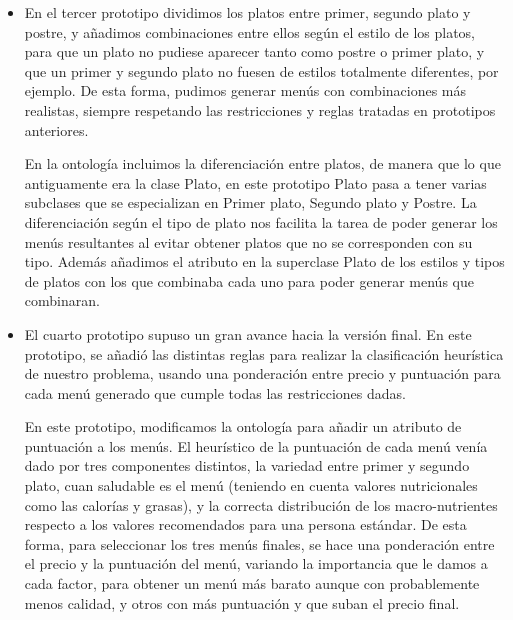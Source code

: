 \documentclass{article}
\begin{document}
\begin{itemize}
    \item En el tercer prototipo dividimos los platos entre primer, segundo plato y postre, y añadimos combinaciones entre ellos según el estilo de los platos, para que un plato no pudiese aparecer tanto como postre o primer plato, y que un primer y segundo plato no fuesen de estilos totalmente diferentes, por ejemplo. De esta forma, pudimos generar menús con combinaciones más realistas, siempre respetando las restricciones y reglas tratadas en prototipos anteriores.
    \par
    En la ontología incluimos la diferenciación entre platos, de manera que lo que antiguamente era la clase Plato, en este prototipo Plato pasa a tener varias subclases que se especializan en Primer plato, Segundo plato y Postre. La diferenciación según el tipo de plato nos facilita la tarea de poder generar los menús resultantes al evitar obtener platos que no se corresponden con su tipo. Además añadimos el atributo en la superclase Plato de los estilos y tipos de platos con los que combinaba cada uno para poder generar menús que combinaran.

    \item El cuarto prototipo supuso un gran avance hacia la versión final. En este prototipo, se añadió las distintas reglas para realizar la clasificación heurística de nuestro problema, usando una ponderación entre precio y puntuación para cada menú generado que cumple todas las restricciones dadas.
    \par
    En este prototipo, modificamos la ontología para añadir un atributo de puntuación a los menús. El heurístico de la puntuación de cada menú venía dado por tres componentes distintos, la variedad entre primer y segundo plato, cuan saludable es el menú (teniendo en cuenta valores nutricionales como las calorías y grasas), y la correcta distribución de los macro-nutrientes respecto a los valores recomendados para una persona estándar. De esta forma, para seleccionar los tres menús finales, se hace una ponderación entre el precio y la puntuación del menú, variando la importancia que le damos a cada factor, para obtener un menú más barato aunque con probablemente menos calidad, y otros con más puntuación y que suban el precio final.


\end{itemize}
\end{document}
